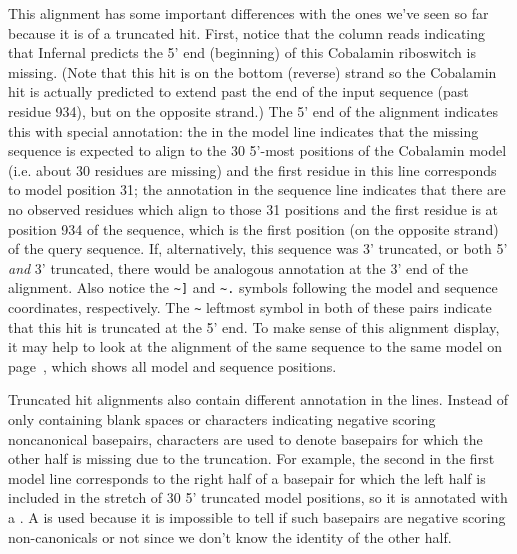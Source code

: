 This alignment has some important differences with the ones we've seen
so far because it is of a truncated hit. First, notice that the
 column reads  indicating that Infernal
predicts the 5' end (beginning) of this Cobalamin riboswitch is
missing. (Note that this hit is on the bottom (reverse) strand so the
Cobalamin hit is actually predicted to extend past the end of the
input sequence (past residue 934), but on the opposite strand.) The 5'
end of the alignment indicates this with special annotation: the
\otext{<[30]*} in the model line indicates that the missing sequence
is expected to align to the 30 5'-most positions of the Cobalamin
model (i.e. about 30 residues are missing) and the first 
residue in this line corresponds to model position 31; the
\otext{<[0]*} annotation in the sequence line indicates that there are
no observed residues which align to those 31 positions and the first
 residue is at position 934 of the sequence, which is the
first position (on the opposite strand) of the query sequence. If,
alternatively, this sequence was 3' truncated, or both 5' \emph{and}
3' truncated, there would be analogous annotation at the 3' end of the
alignment. Also notice the \verb+~]+ and \verb+~.+ symbols following
the model and sequence coordinates, respectively. The \verb+~+
leftmost symbol in both of these pairs indicate that this hit is
truncated at the 5' end. To make sense of this alignment display, it
may help to look at the  alignment of the same sequence
to the same model on page~\pageref{cmalign-cobalamin}, which shows all
model and sequence positions.

Truncated hit alignments also contain different annotation in the
 lines. Instead of only containing blank spaces or 
characters indicating negative scoring noncanonical basepairs,
 characters are used to denote basepairs for which the other
half is missing due to the truncation. For example, the second
 in the first model line corresponds to the right half of a
basepair for which the left half is included in the stretch of 30 5'
truncated model positions, so it is annotated with a .  A
 is used because it is impossible to tell if such basepairs
are negative scoring non-canonicals or not since we don't know the
identity of the other half.


